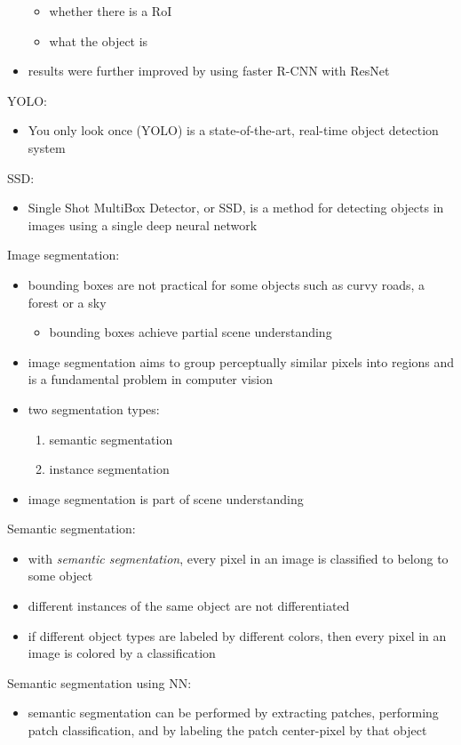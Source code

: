 \documentclass[onecolumn]{IEEEtran}
\newcommand{\bi}{\begin{itemize}}
\newcommand{\ei}{\end{itemize}}
\begin{document}
\begin{itemize}
        \bi
            \item whether there is a RoI
            \item what the object is
        \ei
        \item results were further improved by using faster R-CNN with ResNet \cite{he2015}
    \ei
    \item YOLO:
    \bi
        \item You only look once (YOLO) is a state-of-the-art, real-time object detection system
    \ei
    \item SSD:
    \bi
        \item Single Shot MultiBox Detector, or SSD, is a method for detecting objects in images using a single deep neural network
    \ei
    \item Image segmentation:
    \bi
        \item bounding boxes are not practical for some objects such as curvy roads, a forest or a sky
        \bi
            \item bounding boxes achieve partial scene understanding
        \ei
        \item image segmentation aims to group perceptually similar pixels into regions and is a fundamental problem in computer vision
        \item two segmentation types:
        \begin{enumerate}
            \item semantic segmentation
            \item instance segmentation
        \end{enumerate}
        \item image segmentation is part of scene understanding
    \ei
    \item Semantic segmentation:
    \bi
        \item with \emph{semantic segmentation}, every pixel in an image is classified to belong to some object
        \item different instances of the same object are not differentiated
        \item if different object types are labeled by different colors, then every pixel in an image is colored by a classification
    \ei
    \item Semantic segmentation using NN:
    \bi
        \item semantic segmentation can be performed by extracting patches, performing patch classification, and by labeling the patch center-pixel by that object

\end{itemize}
\end{document}
